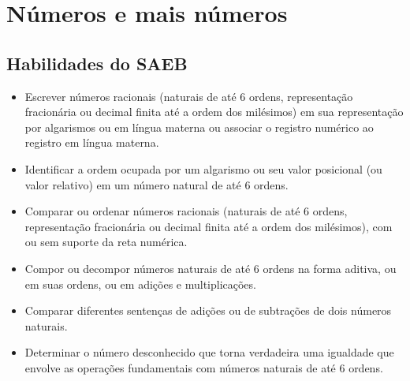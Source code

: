 \pagestyle{mat}
\chapter{Números e mais números}


\section{Habilidades do SAEB}

\begin{itemize}
\item Escrever números racionais (naturais de até 6 ordens, representação
fracionária ou decimal finita até a ordem dos milésimos) em sua
representação por algarismos ou em língua materna ou associar o registro
numérico ao registro em língua materna.

\item Identificar a ordem ocupada por um algarismo ou seu valor posicional
(ou valor relativo) em um número natural de até 6 ordens.

\item Comparar ou ordenar números racionais (naturais de até 6 ordens,
representação fracionária ou decimal finita até a ordem dos milésimos),
com ou sem suporte da reta numérica.

\item Compor ou decompor números naturais de até 6 ordens na forma aditiva,
ou em suas ordens, ou em adições e multiplicações.

\item Comparar diferentes sentenças de adições ou de subtrações de dois números naturais.

\item Determinar o número desconhecido que torna verdadeira uma igualdade
que envolve as operações fundamentais com números naturais de até 6
ordens.
\end{itemize}


